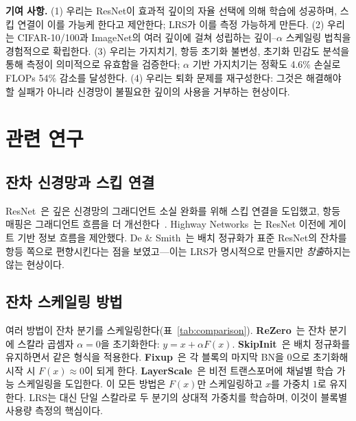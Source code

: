 \documentclass{bmvc2k}
\begin{document}
\textbf{기여 사항.}
(1) 우리는 ResNet이 효과적 깊이의 자율 선택에 의해 학습에 성공하며, 스킵 연결이 이를 가능케 한다고 제안한다; LRS가 이를 측정 가능하게 만든다.
(2) 우리는 CIFAR-10/100과 ImageNet의 여러 깊이에 걸쳐 성립하는 깊이--$\alpha$ 스케일링 법칙을 경험적으로 확립한다.
(3) 우리는 가지치기, 항등 초기화 불변성, 초기화 민감도 분석을 통해 측정이 의미적으로 유효함을 검증한다; $\alpha$ 기반 가지치기는 정확도 4.6\% 손실로 FLOPs 54\% 감소를 달성한다.
(4) 우리는 퇴화 문제를 재구성한다: 그것은 해결해야 할 실패가 아니라 신경망이 불필요한 깊이의 사용을 거부하는 현상이다.

\section{관련 연구}
\label{sec:related}

\subsection{잔차 신경망과 스킵 연결}

ResNet~\cite{he2016deep}은 깊은 신경망의 그래디언트 소실 완화를 위해 스킵 연결을 도입했고, 항등 매핑은 그래디언트 흐름을 더 개선한다~\cite{he2016identity}. Highway Networks~\cite{srivastava2015highway}는 ResNet 이전에 게이트 기반 정보 흐름을 제안했다. De \& Smith~\cite{de2020batch}는 배치 정규화가 표준 ResNet의 잔차를 항등 쪽으로 편향시킨다는 점을 보였고---이는 LRS가 명시적으로 만들지만 \emph{창출}하지는 않는 현상이다.

\subsection{잔차 스케일링 방법}

여러 방법이 잔차 분기를 스케일링한다(표~\ref{tab:comparison}). \textbf{ReZero}~\cite{bachlechner2021rezero}는 잔차 분기에 스칼라 곱셈자 $\alpha = 0$을 초기화한다: $y = x + \alpha F(x)$. \textbf{SkipInit}~\cite{de2020batch}은 배치 정규화를 유지하면서 같은 형식을 적용한다. \textbf{Fixup}~\cite{zhang2019fixup}은 각 블록의 마지막 BN을 0으로 초기화해 시작 시 $F(x) \approx 0$이 되게 한다. \textbf{LayerScale}~\cite{touvron2021going}은 비전 트랜스포머에 채널별 학습 가능 스케일링을 도입한다. 이 모든 방법은 $F(x)$만 스케일링하고 $x$를 가중치 $1$로 유지한다. LRS는 대신 단일 스칼라로 두 분기의 상대적 가중치를 학습하며, 이것이 블록별 사용량 측정의 핵심이다.
\end{document}
